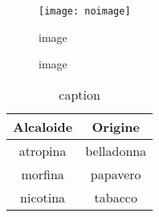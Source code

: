 %
% 
%
\begin{figure}
%
\centering
%
\texttt{[image: noimage]}
%
\caption{image}
%
\label{fig:figure}
%
\end{figure}
%
%


%
% 
%
\begin{figure}
%
\centering
%
 \quad
%
%
\caption{image}
%
\label{fig:subfig}
%
\end{figure}
%
%


%
% 
%
\begin{table}
%
\caption{caption}
%
\label{tab:tabella}
%
\centering
%
\begin{tabular}{cc}
%
\toprule
%
Alcaloide & Origine \\
%
\midrule
%
atropina  & belladonna \\
morfina   & papavero \\
nicotina  & tabacco \\
%
\bottomrule
%
\end{tabular}
%
\end{table}
%
%